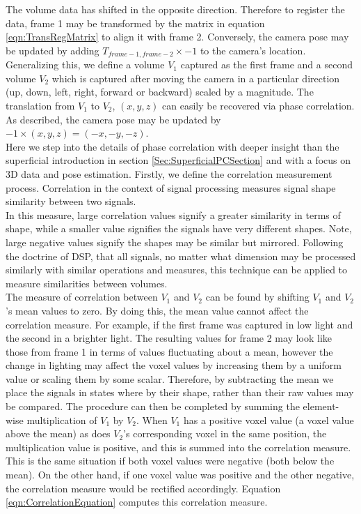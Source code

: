 The volume data has shifted in the opposite direction. Therefore to register the data, frame 1 may be transformed by the matrix in equation \ref{eqn:TransRegMatrix} to align it with frame 2. Conversely, the camera pose may be updated by adding $T_{frame-1,frame-2} \times -1$ to the camera's location.  \\

Generalizing this, we define a volume $V_1$ captured as the first frame and a second volume $V_2$ which is captured after moving the camera in a particular direction (up, down, left, right, forward or backward) scaled by a magnitude. The translation from $V_1$ to $V_2$, $(x,y,z)$ can easily be recovered via phase correlation. As described, the camera pose may be updated by $-1 \times (x,y,z) = (-x,-y,-z)$. \\

Here we step into the details of phase correlation with deeper insight than the superficial introduction in section \ref{Sec:SuperficialPCSection} and with a focus on 3D data and pose estimation. Firstly, we define the correlation measurement process. Correlation in the context of signal processing measures signal shape similarity between two signals. \\

In this measure, large correlation values signify a greater similarity in terms of shape, while a smaller value signifies the signals have very different shapes. Note, large negative values signify the shapes may be similar but mirrored. Following the doctrine of DSP, that all signals, no matter what dimension may be processed similarly with similar operations and measures, this technique can be applied to measure similarities between volumes.  \\

The measure of correlation between $V_1$ and $V_2$ can be found by shifting $V_1$ and $V_2$'s mean values to zero. By doing this, the mean value cannot affect the correlation measure. For example, if the first frame was captured in low light and the second in a brighter light. The resulting values for frame 2 may look like those from frame 1 in terms of values fluctuating about a mean, however the change in lighting may affect the voxel values by increasing them by a uniform value or scaling them by some scalar. Therefore, by subtracting the mean we place the signals in states where by their shape, rather than their raw values may be compared. The procedure can then be completed by summing the element-wise multiplication of $V_1$ by $V_2$. When $V_1$ has a positive voxel value (a voxel value above the mean) as does $V_2$'s corresponding voxel in the same position, the multiplication value is positive, and this is summed into the correlation measure. This is the same situation if both voxel values were negative (both below the mean). On the other hand, if one voxel value was positive and the other negative, the correlation measure would be rectified accordingly. Equation \ref{eqn:CorrelationEquation} computes this correlation measure. 

